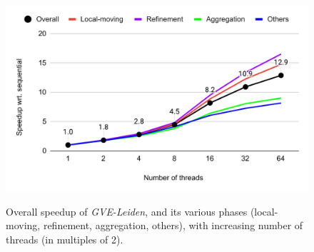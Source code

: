 \begin{figure}[hbtp]
  \centering
  \includegraphics[width=0.98\linewidth]{out/leiden-ss.pdf} \\[0ex]
  \caption{Overall speedup of \textit{GVE-Leiden}, and its various phases (local-moving, refinement, aggregation, others), with increasing number of threads (in multiples of 2).}
  \label{fig:leiden-ss}
\end{figure}
